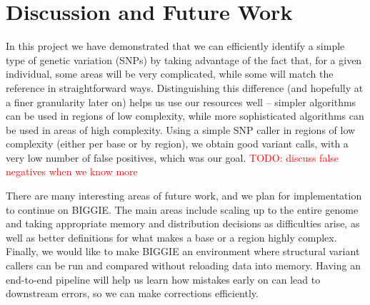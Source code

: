 \documentclass[10pt]{article}
\newcommand\TODO[1]{\textcolor{red}{TODO: #1}}
\begin{document}
\section{Discussion and Future Work}

In this project we have demonstrated that we can efficiently identify a simple type of genetic variation (SNPs) by taking advantage of the fact that, for a given individual, some areas will be very complicated, while some will match the reference in straightforward ways. Distinguishing this difference (and hopefully at a finer granularity later on) helps us use our resources well -- simpler algorithms can be used in regions of low complexity, while more sophisticated algorithms can be used in areas of high complexity. Using a simple SNP caller in regions of low complexity (either per base or by region), we obtain good variant calls, with a very low number of false positives, which was our goal. 
\TODO{discuss false negatives when we know more}

There are many interesting areas of future work, and we plan for implementation to continue on BIGGIE. The main areas include scaling up to the entire genome and taking appropriate memory and distribution decisions as difficulties arise, as well as better definitions for what makes a base or a region highly complex. Finally, we would like to make BIGGIE an environment where structural variant callers can be run and compared without reloading data into memory.  Having an end-to-end pipeline will help us learn how mistakes early on can lead to downstream errors, so we can make corrections efficiently. 

\onecolumn
\end{document}
